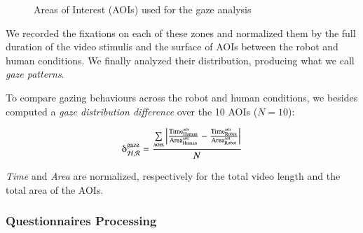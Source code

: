 \documentclass[lettersize, noapacite, twoside, HRI]{apa_HRI}
\begin{document}
\begin{figure}
    \centering

    \caption{Areas of Interest (AOIs) used for the gaze analysis}
    \label{fig:aoi}
\end{figure}

We recorded the fixations on each of these zones and normalized them by
the full duration of the video stimulis and the surface of AOIs between the robot
and human conditions. We finally analyzed their distribution, producing what we call \emph{gaze
patterns}.

To compare gazing behaviours across the robot and human conditions, we besides
computed a \emph{gaze distribution difference} over the 10 AOIs ($N=10$):

{\Large
\[
    \delta_{\mathcal{H}, \mathcal{R}}^{\text{gaze}} =
    \frac{\sum\limits_{{\text{{\sc aoi}s}}}\left |
    \frac{\text{Time}_{\text{Human}}^{\text{\sc
aoi}}}{\text{Area}_{\text{Human}}^{\text{\sc aoi}}} -
\frac{\text{Time}_{\text{Robot}}^{\text{\sc
aoi}}}{\text{Area}_{\text{Robot}}^{\text{\sc aoi}}} \right |}{N}
\]
}

\emph{Time} and \emph{Area} are normalized, respectively for the total
video length and the total area of the AOIs.

\subsubsection{Questionnaires Processing}
\label{questionnaires_processing}
\end{document}
